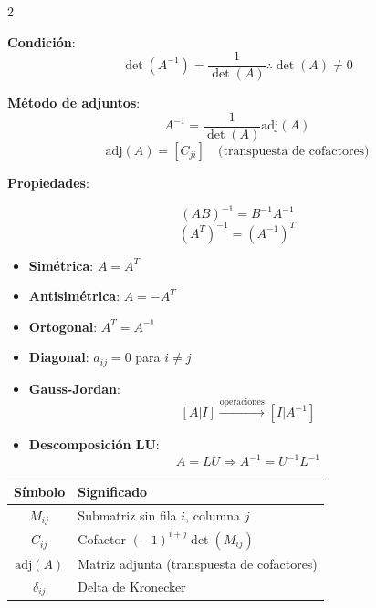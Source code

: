 \begin{multicols}{2}
                \columnbreak

                \begin{itemform}[leftmargin=*]
                \item \textbf{Condición}:
                  $$\det(A^{-1})=\dfrac{1}{\det(A)} \therefore  \det(A) \neq 0 $$

                \item \textbf{Método de adjuntos}:
                  $$ A^{-1} = \frac{1}{\det(A)} \text{adj}(A) $$
                  $$ \text{adj}(A) = [C_{ji}] \quad \text{(transpuesta de cofactores)} $$

                \item \textbf{Propiedades}:

                  $$(AB)^{-1} = B^{-1}A^{-1}$$
                  $$(A^T)^{-1} = (A^{-1})^T$$

                \end{itemform}

                \begin{itemize}[leftmargin=*]
                  \item \textbf{Simétrica}: $A = A^T$
                  \item \textbf{Antisimétrica}: $A = -A^T$
                  \item \textbf{Ortogonal}: $A^T = A^{-1}$
                  \item \textbf{Diagonal}: $a_{ij}=0$ para $i \neq j$
                \end{itemize}

                \begin{itemize}[leftmargin=*]
                  \item \textbf{Gauss-Jordan}:
                    $$ [A|I] \xrightarrow{\text{operaciones}} [I|A^{-1}] $$

                  \item \textbf{Descomposición LU}:
                    $$ A = LU \Rightarrow A^{-1} = U^{-1}L^{-1} $$
                \end{itemize}

              \end{multicols}

              \begin{table}[h]
                \centering
                \footnotesize
                \begin{tabular}{|c|l|}
                  \hline
                  \textbf{Símbolo} & \textbf{Significado} \\ \hline
                  $M_{ij}$ & Submatriz sin fila $i$, columna $j$ \\
                  $C_{ij}$ & Cofactor $(-1)^{i+j}\det(M_{ij})$ \\
                  $\text{adj}(A)$ & Matriz adjunta (transpuesta de cofactores) \\
                  $\delta_{ij}$ & Delta de Kronecker \\ \hline
                \end{tabular}
              \end{table}
              \newpage
